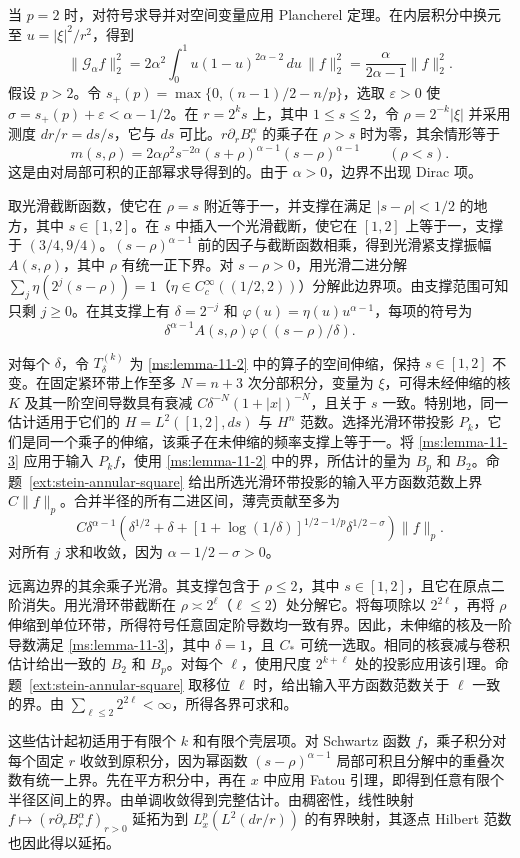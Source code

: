当 $p=2$ 时，对符号求导并对空间变量应用 Plancherel 定理。在内层积分中换元至 $u=|\xi|^2/r^2$，得到
\[
\|\mathcal G_\alpha f\|_2^2=
2\alpha^2\int_0^1u(1-u)^{2\alpha-2}\,du\,\|f\|_2^2
=\frac{\alpha}{2\alpha-1}\|f\|_2^2.
\]
假设 $p>2$。令 $s_+(p)=\max\{0,(n-1)/2-n/p\}$，选取 $\varepsilon>0$ 使 $\sigma=s_+(p)+\varepsilon<\alpha-1/2$。在 $r=2^k s$ 上，其中 $1\le s\le2$，令 $\rho=2^{-k}|\xi|$ 并采用测度 $dr/r=ds/s$，它与 $ds$ 可比。$r\partial_r B_r^\alpha$ 的乘子在 $\rho>s$ 时为零，其余情形等于
\[
 m(s,\rho)=2\alpha \rho^2s^{-2\alpha}(s+\rho)^{\alpha-1}(s-\rho)^{\alpha-1}
 \qquad (\rho<s).
\]
这是由对局部可积的正部幂求导得到的。由于 $\alpha>0$，边界不出现 Dirac 项。

取光滑截断函数，使它在 $\rho=s$ 附近等于一，并支撑在满足 $|s-\rho|<1/2$ 的地方，其中 $s\in[1,2]$。在 $s$ 中插入一个光滑截断，使它在 $[1,2]$ 上等于一，支撑于 $(3/4,9/4)$。$(s-\rho)^{\alpha-1}$ 前的因子与截断函数相乘，得到光滑紧支撑振幅 $A(s,\rho)$，其中 $\rho$ 有统一正下界。对 $s-\rho>0$，用光滑二进分解 $\sum_j\eta(2^j(s-\rho))=1$（$\eta\in C_c^\infty((1/2,2))$）分解此边界项。由支撑范围可知只剩 $j\ge0$。在其支撑上有 $\delta=2^{-j}$ 和 $\varphi(u)=\eta(u)u^{\alpha-1}$，每项的符号为
\[
 \delta^{\alpha-1} A(s,\rho)\varphi((s-\rho)/\delta).
\]

对每个 $\delta$，令 $T_\delta^{(k)}$ 为 \ref{ms:lemma-11-2} 中的算子的空间伸缩，保持 $s\in[1,2]$ 不变。在固定紧环带上作至多 $N=n+3$ 次分部积分，变量为 $\xi$，可得未经伸缩的核 $K$ 及其一阶空间导数具有衰减 $C\delta^{-N}(1+|x|)^{-N}$，且关于 $s$ 一致。特别地，同一估计适用于它们的 $H=L^2([1,2],ds)$ 与 $H^n$ 范数。选择光滑环带投影 $P_k$，它们是同一个乘子的伸缩，该乘子在未伸缩的频率支撑上等于一。将 \ref{ms:lemma-11-3} 应用于输入 $P_kf$，使用 \ref{ms:lemma-11-2} 中的界，所估计的量为 $B_p$ 和 $B_2$。命题~\ref{ext:stein-annular-square} 给出所选光滑环带投影的输入平方函数范数上界 $C\|f\|_p$。合并半径的所有二进区间，薄壳贡献至多为
\[
 C\delta^{\alpha-1}
 \left(\delta^{1/2}+\delta+
 [1+\log(1/\delta)]^{1/2-1/p}\delta^{1/2-\sigma}\right)\|f\|_p.
\]
对所有 $j$ 求和收敛，因为 $\alpha-1/2-\sigma>0$。

远离边界的其余乘子光滑。其支撑包含于 $\rho\le2$，其中 $s\in[1,2]$，且它在原点二阶消失。用光滑环带截断在 $\rho\asymp2^\ell$（$\ell\le2$）处分解它。将每项除以 $2^{2\ell}$，再将 $\rho$ 伸缩到单位环带，所得符号任意固定阶导数均一致有界。因此，未伸缩的核及一阶导数满足 \ref{ms:lemma-11-3}，其中 $\delta=1$，且 $C_*$ 可统一选取。相同的核衰减与卷积估计给出一致的 $B_2$ 和 $B_p$。对每个 $\ell$，使用尺度 $2^{k+\ell}$ 处的投影应用该引理。命题~\ref{ext:stein-annular-square} 取移位 $\ell$ 时，给出输入平方函数范数关于 $\ell$ 一致的界。由 $\sum_{\ell\le2}2^{2\ell}<\infty$，所得各界可求和。

这些估计起初适用于有限个 $k$ 和有限个壳层项。对 Schwartz 函数 $f$，乘子积分对每个固定 $r$ 收敛到原积分，因为幂函数 $(s-\rho)^{\alpha-1}$ 局部可积且分解中的重叠次数有统一上界。先在平方积分中，再在 $x$ 中应用 Fatou 引理，即得到任意有限个半径区间上的界。由单调收敛得到完整估计。由稠密性，线性映射 $f\mapsto (r\partial_r B_r^\alpha f)_{r>0}$ 延拓为到 $L_x^p(L^2(dr/r))$ 的有界映射，其逐点 Hilbert 范数也因此得以延拓。
